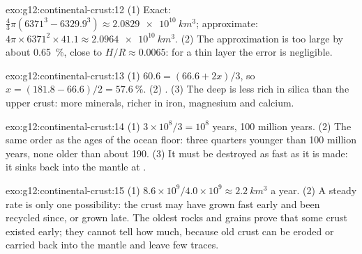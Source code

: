 \begin{solution}{exo:g12:continental-crust:12}
(1) Exact: $\tfrac{4}{3}\pi(6371^3 - 6329.9^3) \approx
\qty{2.0829e10}{km^3}$; approximate: $4\pi \times 6371^2 \times 41.1
\approx \qty{2.0964e10}{km^3}$. (2) The approximation is too large by about
\qty{0.65}{\percent}, close to $H/R \approx 0.0065$: for a thin layer the
error is negligible.
\end{solution}

\begin{solution}{exo:g12:continental-crust:13}
(1) $60.6 = (66.6 + 2x)/3$, so $x = (181.8 - 66.6)/2 = \qty{57.6}{\percent}$.
(2) . (3) The deep  is less rich in silica than
the upper crust: more  minerals, richer in iron, magnesium and calcium.
\end{solution}

\begin{solution}{exo:g12:continental-crust:14}
(1) $3 \times 10^8/3 = 10^8$ years, 100 million years. (2) The same order as
the ages of the ocean floor: three quarters younger than 100 million years,
none older than about 190. (3) It must be destroyed as fast as it is made:
it sinks back into the mantle at .
\end{solution}

\begin{solution}{exo:g12:continental-crust:15}
(1) $8.6 \times 10^9 / 4.0 \times 10^9 \approx \qty{2.2}{km^3}$ a year.
(2) A steady rate is only one possibility: the crust may have grown fast early
and been recycled since, or grown late. The oldest rocks and grains prove
that some crust existed early; they cannot tell how much, because old crust
can be eroded or carried back into the mantle and leave few traces.
\end{solution}


